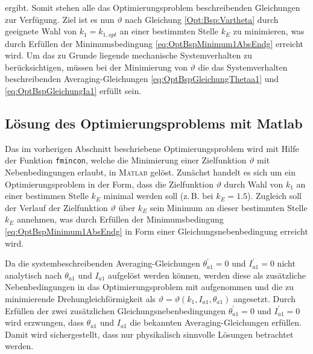 %
ergibt. Somit stehen alle das Optimierungsproblem beschreibenden Gleichungen zur Verfügung.
%
Ziel ist es nun $\vartheta$ nach Gleichung	\eqref{Opt:Bsp:Vartheta} durch geeignete Wahl 
von $k_1=k_{1,opt}$  an einer bestimmten Stelle $k_E$ zu minimieren,
was durch Erfüllen der Minimumsbedingung \eqref{eq:OptBspMinimum1AbsEndg} erreicht wird.
Um das zu Grunde liegende mechanische Systemverhalten zu berücksichtigen, müssen bei der Minimierung von $\vartheta$ die das
Systemverhalten beschreibenden Averaging-Gleichungen	\eqref{eq:OptBspGleichungThetaa1} und \eqref{eq:OptBspGleichungIa1}  erfüllt sein.
%










\newpage
\subsection{Lösung des Optimierungsproblems mit Matlab}

Das im vorherigen Abschnitt beschriebene Optimierungsproblem wird mit Hilfe der Funktion \texttt{fmincon},  
welche die Minimierung einer Zielfunktion $\vartheta$ mit Nebenbedingungen %
erlaubt,  in \textsc{Matlab} gelöst. 
Zunächst handelt es sich um ein Optimierungsproblem in der Form, 
dass die Zielfunktion $\vartheta$ durch Wahl von $k_1$  an einer bestimmen Stelle $k_E$ minimal werden soll (z.\,B. bei $k_E = 1.5$).
%
Zugleich soll der Verlauf der Zielfunktion $\vartheta$ über $k_E$ sein Minimum an dieser bestimmten Stelle $k_E$ annehmen, 
was durch Erfüllen der Minimumsbedingung \eqref{eq:OptBspMinimum1AbsEndg} in Form einer Gleichungsnebenbedingung erreicht wird.


Da die systembeschreibenden Averaging-Gleichungen $\theta_{a1}^\prime = 0$ und $I_{a1}^\prime=0$ nicht analytisch nach $\theta_{a1}$ und $I_{a1}$ aufgelöst werden können,
werden diese als zusätzliche Nebenbedingungen in das Optimierungsproblem mit aufgenommen und 
die zu minimierende Drehungleichförmigkeit als $\vartheta = \vartheta(k_1,I_{a1},\theta_{a1}) $ angesetzt. 
Durch Erfüllen der zwei zusätzlichen Gleichungsnebenbedingungen $\theta_{a1}^\prime = 0$ und $I_{a1}^\prime=0$ wird erzwungen, dass $\theta_{a1}$ und $I_{a1}$ die 
bekannten Averaging-Gleichungen erfüllen. 
Damit wird sichergestellt, dass nur physikalisch sinnvolle Lösungen betrachtet werden.

